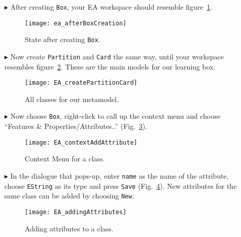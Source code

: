 \begin{itemize}
\vfill
\pagebreak

\item[$\blacktriangleright$] After creating \texttt{Box}, your EA workspace should resemble figure~\ref{fig:eclass_completed}.

\begin{figure}[htbp]
	\centering
  \texttt{[image: ea\_afterBoxCreation]}
	\caption{State after creating \texttt{Box}.}
	\label{fig:eclass_completed}
\end{figure}

\item[$\blacktriangleright$] Now create \texttt{Partition} and \texttt{Card} the same way, until your workspace resembles figure~\ref{fig:all_eclasses}.
These are the main models for our learning box.

\vspace{1cm}

\begin{figure}[htbp]
	\centering
  \texttt{[image: EA\_createPartitionCard]}
	\caption{All classes for our metamodel.}
	\label{fig:all_eclasses}
\end{figure}

\vfill
\pagebreak

\item[$\blacktriangleright$] Now choose \texttt{Box}, right-click to call up the context menu and choose ``Features \& Properties/Attributes..'' (Fig.~\ref{fig:attribute}).

\begin{figure}[htbp]
	\centering
  \texttt{[image: EA\_contextAddAttribute]}
	\caption{Context Menu for a class.}
	\label{fig:attribute}
\end{figure}
\FloatBarrier

\vspace{0.5cm}

\item[$\blacktriangleright$] In the dialogue that pops-up, enter \texttt{name} as the name of the attribute, choose \texttt{EString} as its type and press \texttt{Save} (Fig.~\ref{fig:attribute_properties}). New attributes for the same class can be added by choosing \texttt{New}.

\vspace{0.5cm}

\begin{figure}[htbp]
	\centering
  \texttt{[image: EA\_addingAttributes]}
	\caption{Adding attributes to a class.}
	\label{fig:attribute_properties}
\end{figure}


\end{itemize}
